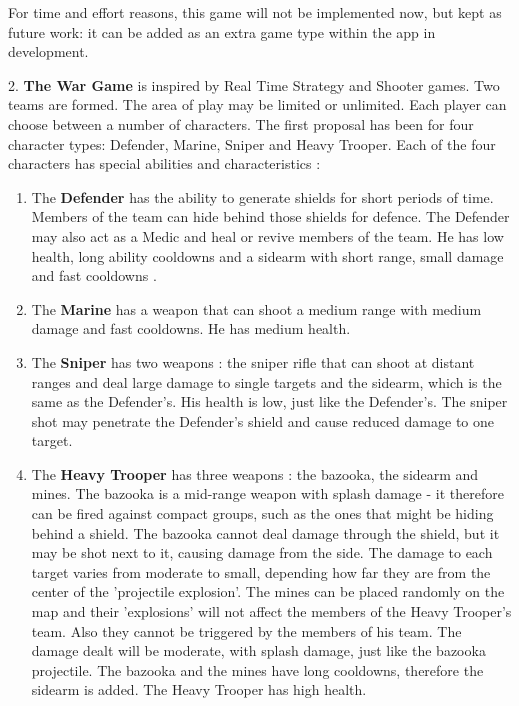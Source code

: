 For time and effort reasons, this game will not be implemented now, but kept as
future work: it can be added as an extra game type within the app in
development.\newline

2. \textbf{The War Game} is inspired by Real Time Strategy and Shooter games.
Two teams are formed. The area of play may be limited or unlimited. Each
player can choose between a number of characters. The first proposal has been
for four character types: Defender, Marine, Sniper and Heavy Trooper. Each of
the four characters has special abilities and characteristics :
\begin{enumerate}
	
	\item The \textbf{Defender} has the ability to generate shields for short
	periods of time. Members of the team can hide behind those shields for defence.
	The Defender may also act as a Medic and heal or revive members of the team. He
	has low health, long ability cooldowns and a sidearm with short range, small
	damage and fast cooldowns .
	
	\item The \textbf{Marine} has a weapon that can shoot a medium range with
	medium damage and fast cooldowns. He has medium health. 
	
	\item The \textbf{Sniper} has two weapons : the sniper rifle that can shoot at
	distant ranges and deal large damage to single targets and the sidearm, which
	is the same as the Defender's. His health is low, just like the Defender's. The
	sniper shot may penetrate the Defender's shield and cause reduced damage to one
	target.	
	
	\item The \textbf{Heavy Trooper} has three weapons : the bazooka, the sidearm
	and mines. The bazooka is a mid-range weapon with splash damage - it therefore
	can be fired against compact groups, such as the ones that might be hiding
	behind a shield. The bazooka cannot deal damage through the shield, but it may
	be shot next to it, causing damage from the side. The damage to each target
	varies from moderate to small, depending how far they are from the center of
	the 'projectile explosion'. The mines can be placed randomly on the map and
	their 'explosions' will not affect the members of the Heavy Trooper's team.
	Also they cannot be triggered by the members of his team. The damage dealt will
	be moderate, with splash damage, just like the bazooka projectile. The bazooka
	and the mines have long cooldowns, therefore the sidearm is added. The Heavy
	Trooper has high health.
	 
\end{enumerate}


